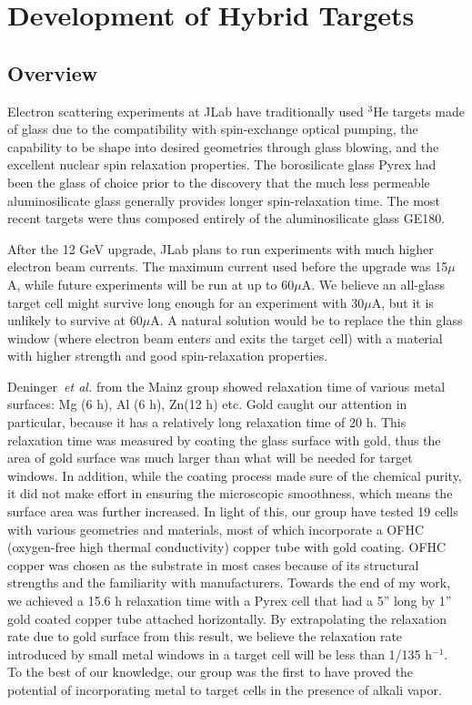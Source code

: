 \chapter{Development of Hybrid Targets}
\label{chap5}

\section{Overview}

Electron scattering experiments at JLab have traditionally used $^{3}$He targets made of glass due to the compatibility with spin-exchange optical pumping, the capability to be shape into desired geometries through glass blowing, and the excellent nuclear spin relaxation properties. The borosilicate glass Pyrex had been the glass of choice prior to the discovery that the much less permeable aluminosilicate glass generally provides longer spin-relaxation time. The most recent targets were thus composed entirely of the aluminosilicate glass GE180.

After the 12 GeV upgrade, JLab plans to run experiments with much higher electron beam currents. The maximum current used before the upgrade was 15$\mu$A, while future experiments will be run at up to 60$\mu$A. We believe an all-glass target cell might survive long enough for an experiment with 30$\mu$A, but it is unlikely to survive at 60$\mu$A. A natural solution would be to replace the thin glass window (where electron beam enters and exits the target cell) with a material with higher strength and good spin-relaxation properties. 

Deninger~\emph{et al.} from the Mainz group showed relaxation time of various metal surfaces: Mg (6 h), Al (6 h), Zn(12 h) etc. Gold caught our attention in particular, because it has a relatively long relaxation time of 20 h. This relaxation time was measured by coating the glass surface with gold, thus the area of gold surface was much larger than what will be needed for target windows. In addition, while the coating process made sure of the chemical purity, it did not make effort in ensuring the microscopic smoothness, which means the surface area was further increased. In light of this, our group have tested 19 cells with various geometries and materials, most of which incorporate a OFHC (oxygen-free high thermal conductivity) copper tube with gold coating. OFHC copper was chosen as the substrate in most cases because of its structural strengths and the familiarity with manufacturers. Towards the end of my work, we achieved a 15.6 h relaxation time with a Pyrex cell that had a 5'' long by 1'' gold coated copper tube attached horizontally. By extrapolating the relaxation rate due to gold surface from this result, we believe the relaxation rate introduced by small metal windows in a target cell will be less than 1/135 h$^{-1}$. To the best of our knowledge, our group was the first to have proved the potential of incorporating metal to target cells in the presence of alkali vapor.

